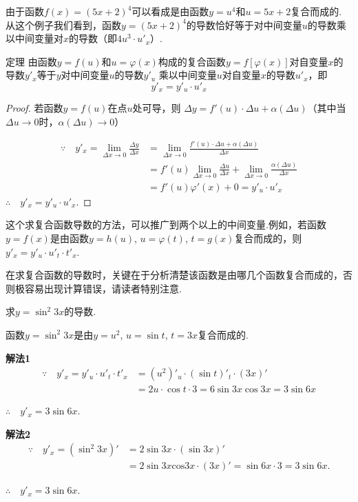 由于函数$f(x)=(5x+2)^4$可以看成是由函数$y=u^4$和$u=5x+2$复合而成的. 从这个例子我们看到，函数$y=(5x+2)^4$的导数恰好等于对中间变量$u$的导数乘以中间变量对$x$的导数（即$4u^3\cdot u'_x$）.

\begin{thm}
{定理} 由函数$y=f(u)$和$u=\varphi(x)$构成的复合函数$y=f[\varphi(x)]$对自变量$x$的导数$y'_x$等于$y$对中间变量$u$的导数$y'_u$ 乘以中间变量$u$对自变量$x$的导数$u'_x$，即
\[y'_x=y'_u\cdot u'_x\]    
\end{thm}

\begin{proof}
若函数$y=f(u)$在点$u$处可导，则
    $\Delta y=f' \left(u\right)\cdot \Delta u+\alpha\left(\Delta u\right)$（其中当$\Delta u\to0$时，$\alpha(\Delta u)\to0$）

\[\begin{split}
    \because\quad y'_x=\lim_{\Delta x\to0}\frac{\Delta y}{\Delta x}&=\lim_{\Delta x\to0}\frac{f' (u)\cdot\Delta u+\alpha(\Delta u)}{\Delta x}\\
    &=f' \left(u\right)\lim_{\Delta x\to0}\frac{\Delta u}{\Delta x}+\lim_{\Delta x\to0}\frac{\alpha\left(\Delta u\right)}{\Delta x}\\
    &=f'(u)\varphi' (x)+0=y'_{u}\cdot  u'_{x}
\end{split}\]
$\therefore\quad y'_x=y'_{u}\cdot  u'_{x}$.
\end{proof}

\begin{rmk}
这个求复合函数导数的方法，可以推广到两个以上的中间变量.例如，若函数$y=f(x)$是由函数$y=h(u)$, $u=\varphi(t)$, $t=g(x)$复合而成的，则$y'_x=y'_u\cdot u'_t\cdot t'_x$.
\end{rmk}

在求复合函数的导数时，关键在于分析清楚该函数是由哪几个函数复合而成的，否则极容易出现计算错误，请读者特别注意.

\begin{example}
    求$y=\sin^2 3x$的导数.
\end{example}

\begin{analyze}
函数$y=\sin^2 3x$是由$y=u^2$, $u=\sin t$, $t=3x$复合而成的.
\end{analyze}

\begin{solution}
\textbf{解法1} 
\[\begin{split}
    \because\quad y'_x=y'_u\cdot u'_t\cdot t'_x &=(u^2)'_u\cdot (\sin t)'_t\cdot (3x)'\\
    &=2u\cdot \cos t\cdot 3 =6\sin 3x\cos 3x=3\sin 6x
\end{split}\]

$\therefore\quad y'_x=3\sin 6x$.

\textbf{解法2}
\[\begin{split}
    \because \quad y' _{x}=(\sin^{2}3x)' &=2\sin3x\cdot (\sin 3x)' \\
    &=2\sin 3x\mathrm{cos}3x\cdot (3x)' =\sin 6x\cdot 3 =3\sin 6x.
\end{split}\]

$\therefore\quad y'_x=3\sin 6x$.
\end{solution}

